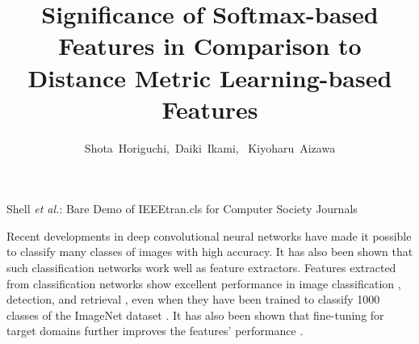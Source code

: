 \documentclass[9pt,technote,compsoc]{./sty/IEEEtran}
\begin{document}
\title{Significance of Softmax-based Features in Comparison to Distance Metric Learning-based Features}

\author{Shota~Horiguchi,~Daiki~Ikami, ~Kiyoharu~Aizawa
}


%
{Shell \MakeLowercase{\textit{et al.}}: Bare Demo of IEEEtran.cls for Computer Society Journals}





\maketitle


\IEEEdisplaynontitleabstractindextext



\IEEEpeerreviewmaketitle

\vspace{1cm}


Recent developments in deep convolutional neural networks have made it possible to classify many classes of images with high accuracy.
It has also been shown that such classification networks work well as feature extractors.
Features extracted from classification networks show excellent performance in image classification \cite{donahue2014decaf}, detection, and retrieval \cite{razavian2014cnn}\cite{liu2015deepindex}, even when they have been trained to classify 1000 classes of the ImageNet dataset \cite{russakovsky2015imagenet}.
It has also been shown that fine-tuning for target domains further improves the features' performance \cite{wan2014deep}\cite{babenko2014neural}.
\end{document}

